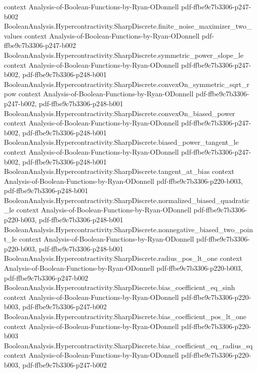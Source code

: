 \begin{theorem}
  {context}
  {Analysis-of-Boolean-Functions-by-Ryan-ODonnell}
  {pdf-ffbe9c7b3306-p247-b002}
\proofstep
  {BooleanAnalysis.Hypercontractivity.SharpDiscrete.finite_noise_maximizer_two_values}
  {context}
  {Analysis-of-Boolean-Functions-by-Ryan-ODonnell}
  {pdf-ffbe9c7b3306-p247-b002}
\proofstep
  {BooleanAnalysis.Hypercontractivity.SharpDiscrete.symmetric_power_slope_le}
  {context}
  {Analysis-of-Boolean-Functions-by-Ryan-ODonnell}
  {pdf-ffbe9c7b3306-p247-b002,
    pdf-ffbe9c7b3306-p248-b001}
\proofstep
  {BooleanAnalysis.Hypercontractivity.SharpDiscrete.convexOn_symmetric_sqrt_rpow}
  {context}
  {Analysis-of-Boolean-Functions-by-Ryan-ODonnell}
  {pdf-ffbe9c7b3306-p247-b002,
    pdf-ffbe9c7b3306-p248-b001}
\proofstep
  {BooleanAnalysis.Hypercontractivity.SharpDiscrete.convexOn_biased_power}
  {context}
  {Analysis-of-Boolean-Functions-by-Ryan-ODonnell}
  {pdf-ffbe9c7b3306-p247-b002,
    pdf-ffbe9c7b3306-p248-b001}
\proofstep
  {BooleanAnalysis.Hypercontractivity.SharpDiscrete.biased_power_tangent_le}
  {context}
  {Analysis-of-Boolean-Functions-by-Ryan-ODonnell}
  {pdf-ffbe9c7b3306-p247-b002,
    pdf-ffbe9c7b3306-p248-b001}
\proofstep
  {BooleanAnalysis.Hypercontractivity.SharpDiscrete.tangent_at_bias}
  {context}
  {Analysis-of-Boolean-Functions-by-Ryan-ODonnell}
  {pdf-ffbe9c7b3306-p220-b003,
    pdf-ffbe9c7b3306-p248-b001}
\proofstep
  {BooleanAnalysis.Hypercontractivity.SharpDiscrete.normalized_biased_quadratic_le}
  {context}
  {Analysis-of-Boolean-Functions-by-Ryan-ODonnell}
  {pdf-ffbe9c7b3306-p220-b003,
    pdf-ffbe9c7b3306-p248-b001}
\proofstep
  {BooleanAnalysis.Hypercontractivity.SharpDiscrete.nonnegative_biased_two_point_le}
  {context}
  {Analysis-of-Boolean-Functions-by-Ryan-ODonnell}
  {pdf-ffbe9c7b3306-p220-b003,
    pdf-ffbe9c7b3306-p248-b001}
\proofstep
  {BooleanAnalysis.Hypercontractivity.SharpDiscrete.radius_pos_lt_one}
  {context}
  {Analysis-of-Boolean-Functions-by-Ryan-ODonnell}
  {pdf-ffbe9c7b3306-p220-b003,
    pdf-ffbe9c7b3306-p247-b002}
\proofstep
  {BooleanAnalysis.Hypercontractivity.SharpDiscrete.bias_coefficient_eq_sinh}
  {context}
  {Analysis-of-Boolean-Functions-by-Ryan-ODonnell}
  {pdf-ffbe9c7b3306-p220-b003,
    pdf-ffbe9c7b3306-p247-b002}
\proofstep
  {BooleanAnalysis.Hypercontractivity.SharpDiscrete.bias_coefficient_pos_lt_one}
  {context}
  {Analysis-of-Boolean-Functions-by-Ryan-ODonnell}
  {pdf-ffbe9c7b3306-p220-b003}
\proofstep
  {BooleanAnalysis.Hypercontractivity.SharpDiscrete.bias_coefficient_eq_radius_sq}
  {context}
  {Analysis-of-Boolean-Functions-by-Ryan-ODonnell}
  {pdf-ffbe9c7b3306-p220-b003,
    pdf-ffbe9c7b3306-p247-b002}

\end{theorem}
